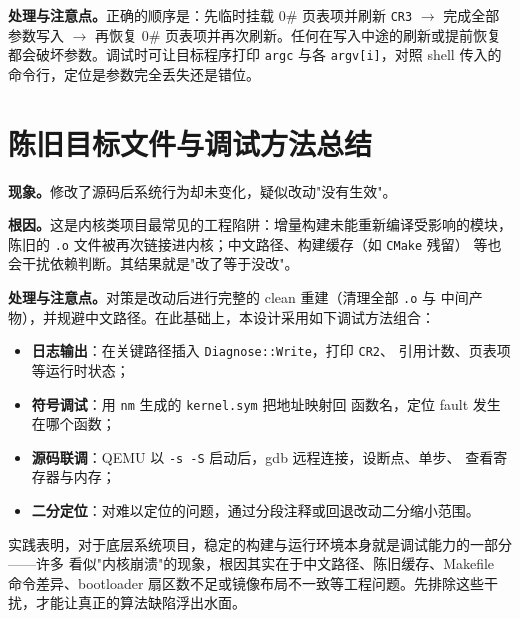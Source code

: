 \textbf{处理与注意点。}正确的顺序是：先临时挂载 0\# 页表项并刷新 \texttt{CR3} $\to$
完成全部参数写入 $\to$ 再恢复 0\# 页表项并再次刷新。任何在写入中途的刷新或提前恢复
都会破坏参数。调试时可让目标程序打印 \texttt{argc} 与各 \texttt{argv[i]}，对照 shell
传入的命令行，定位是参数完全丢失还是错位。

\section{陈旧目标文件与调试方法总结}
\textbf{现象。}修改了源码后系统行为却未变化，疑似改动"没有生效"。

\textbf{根因。}这是内核类项目最常见的工程陷阱：增量构建未能重新编译受影响的模块，
陈旧的 \texttt{.o} 文件被再次链接进内核；中文路径、构建缓存（如 \texttt{CMake} 残留）
等也会干扰依赖判断。其结果就是"改了等于没改"。

\textbf{处理与注意点。}对策是改动后进行完整的 clean 重建（清理全部 \texttt{.o} 与
中间产物），并规避中文路径。在此基础上，本设计采用如下调试方法组合：
\begin{itemize}
  \item \textbf{日志输出}：在关键路径插入 \texttt{Diagnose::Write}，打印 \texttt{CR2}、
        引用计数、页表项等运行时状态；
  \item \textbf{符号调试}：用 \texttt{nm} 生成的 \texttt{kernel.sym} 把地址映射回
        函数名，定位 fault 发生在哪个函数；
  \item \textbf{源码联调}：QEMU 以 \texttt{-s -S} 启动后，gdb 远程连接，设断点、单步、
        查看寄存器与内存；
  \item \textbf{二分定位}：对难以定位的问题，通过分段注释或回退改动二分缩小范围。
\end{itemize}

实践表明，对于底层系统项目，稳定的构建与运行环境本身就是调试能力的一部分——许多
看似"内核崩溃"的现象，根因其实在于中文路径、陈旧缓存、Makefile 命令差异、bootloader
扇区数不足或镜像布局不一致等工程问题。先排除这些干扰，才能让真正的算法缺陷浮出水面。
